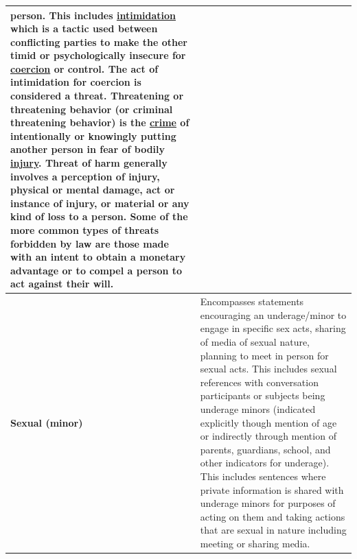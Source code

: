 \documentclass[11pt]{article}
\begin{document}
\begin{table}[h]
{\begin{tabular}{p{2cm}p{11cm}}
person. This includes
\href{https://en.wikipedia.org/wiki/Intimidation}{intimidation}
which is a tactic used between conflicting parties to make the other
timid or psychologically insecure for
\href{https://en.wikipedia.org/wiki/Coercion}{coercion} or control.
The act of intimidation for coercion is considered a threat.
Threatening or threatening behavior (or criminal threatening behavior) is the \href{https://en.wikipedia.org/wiki/Crime}{crime} of intentionally or knowingly putting another person in fear of bodily \href{https://en.wikipedia.org/wiki/Injury}{injury}. Threat of harm generally involves a perception of injury, physical or mental damage, act or instance of injury, or material or any kind of loss to a person. Some of the more common types of threats forbidden by law are those made
with an intent to obtain a monetary advantage or to compel a person to act against their will. \\
\midrule
    \textbf{Sexual (minor)} &
Encompasses statements encouraging an underage/minor
to engage in specific sex acts, sharing of media of sexual nature, planning to meet in person for sexual acts.
This includes sexual references with conversation participants or
subjects being underage minors (indicated explicitly though mention of
age or indirectly through mention of parents, guardians, school, and
other indicators for underage). This includes sentences where private
information is shared with underage minors for purposes of acting on
them and taking actions that are sexual in nature including meeting or
sharing media. \\
    \bottomrule
    \end{tabular}
    }
\end{table}
\end{document}
